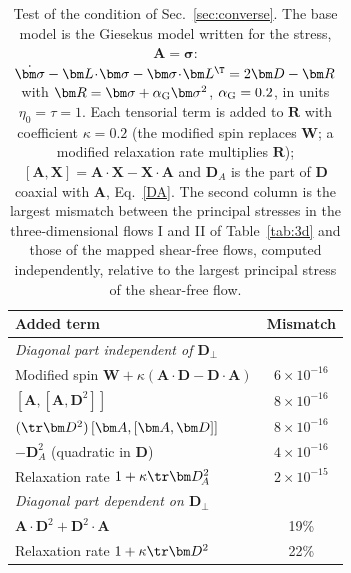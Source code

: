 \begin{table}
\caption{Test of the condition of Sec.~\ref{sec:converse}. The base model is the Giesekus model written for the stress, $\bm A=\bm\sigma$: $\dot{\bm\sigma}-\bm L\!\cdot\!\bm\sigma-\bm\sigma\!\cdot\!\bm L^\T=2\bm D-\bm R$ with $\bm R=\bm\sigma+\alpha_{\rm G}\bm\sigma^2$, $\alpha_{\rm G}=0.2$, in units $\eta_0=\tau=1$. Each tensorial term is added to $\bm R$ with coefficient $\kappa=0.2$ (the modified spin replaces $\bm W$; a modified relaxation rate multiplies $\bm R$); $[\bm A,\bm X]=\bm A\!\cdot\!\bm X-\bm X\!\cdot\!\bm A$ and $\bm D_{\!A}$ is the part of $\bm D$ coaxial with $\bm A$, Eq.~\eqref{DA}. The second column is the largest mismatch between the principal stresses in the three-dimensional flows I and II of Table~\ref{tab:3d} and those of the mapped shear-free flows, computed independently, relative to the largest principal stress of the shear-free flow.}
\begin{ruledtabular}
\begin{tabular}{lc}
Added term & Mismatch\\
\hline
\multicolumn{2}{l}{\emph{Diagonal part independent of $\bm D_{\!\perp}$}}\\
Modified spin $\bm W+\kappa(\bm A\!\cdot\!\bm D-\bm D\!\cdot\!\bm A)$ & $6\times10^{-16}$\\
$[\bm A,[\bm A,\bm D^2]]$ & $8\times10^{-16}$\\
$(\tr\bm D^2)\,[\bm A,[\bm A,\bm D]]$ & $8\times10^{-16}$\\
$-\bm D_{\!A}^2$ (quadratic in $\bm D$) & $4\times10^{-16}$\\
Relaxation rate $1+\kappa\tr\bm D_{\!A}^2$ & $2\times10^{-15}$\\
\hline
\multicolumn{2}{l}{\emph{Diagonal part dependent on $\bm D_{\!\perp}$}}\\
$\bm A\!\cdot\!\bm D^2+\bm D^2\!\cdot\!\bm A$ & 19\%\\
Relaxation rate $1+\kappa\tr\bm D^2$ & 22\%\\
\end{tabular}
\end{ruledtabular}
\end{table}
